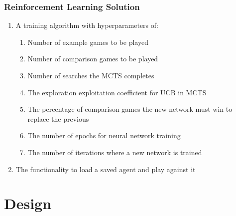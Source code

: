 \documentclass{article}
\begin{document}
    \subsubsection{Reinforcement Learning Solution} \label{RLS Objs}
    \begin{enumerate}
        \item A training algorithm with hyperparameters of:
        \begin{enumerate}
            \item Number of example games to be played
            \item Number of comparison games to be played
            \item Number of searches the MCTS completes
            \item The exploration exploitation coefficient for UCB in MCTS
            \item The percentage of comparison games the new network must win to replace the previous
            \item The number of epochs for neural network training
            \item The number of iterations where a new network is trained
        \end{enumerate}
        \item The functionality to load a saved agent and play against it
    \end{enumerate}

    \section{Design}
    \secttoc
\end{document}
